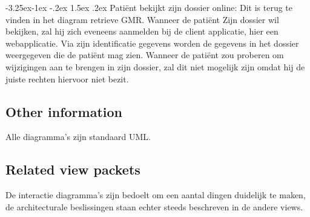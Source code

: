 \documentclass[a4paper,10pt]{article}
\makeatletter
\renewcommand\paragraph{\@startsection{paragraph}{4}{\z@}%
  {-3.25ex\@plus -1ex \@minus -.2ex}%
  {1.5ex \@plus .2ex}%
  {\normalfont\normalsize\bfseries}}
\makeatother
\begin{document}
\paragraph{Patiënt bekijkt zijn dossier online:}
Dit is terug te vinden in het diagram retrieve GMR. Wanneer de patiënt Zijn dossier wil bekijken, zal hij zich eveneens aanmelden bij de client applicatie, hier een webapplicatie. Via zijn identificatie gegevens worden de gegevens in het dossier weergegeven die de patiënt mag zien. Wanneer de patiënt zou proberen om wijzigingen aan te brengen in zijn dossier, zal dit niet mogelijk zijn omdat hij de juiste rechten hiervoor niet bezit.

\subsection{Other information}
Alle diagramma's zijn standaard UML.

\subsection{Related view packets}
De interactie diagramma's zijn bedoelt om een aantal dingen duidelijk te maken, de architecturale beslissingen staan echter steeds beschreven in de andere views.
\end{document}
